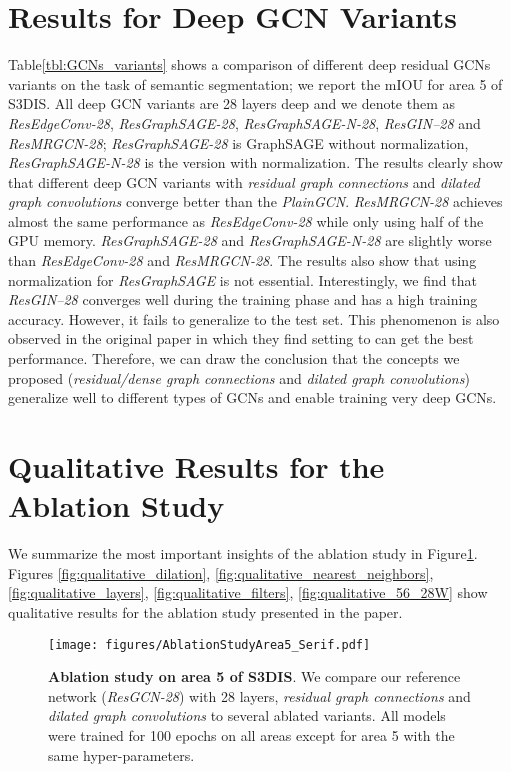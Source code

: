 \documentclass[10pt,twocolumn,letterpaper]{article}
\newcommand{\figLabel}{Figure\xspace}
\newcommand{\tblLabel}{Table\xspace}
\begin{document}
\section{Results for Deep GCN Variants}\label{appendix:results_gcn_variants}
\tblLabel \ref{tbl:GCNs_variants} shows a comparison of different deep residual GCNs variants on the task of semantic segmentation; we report the mIOU for area 5 of S3DIS. All deep GCN variants are 28 layers deep and we denote them as \emph{ResEdgeConv-28}, \emph{ResGraphSAGE-28}, \emph{ResGraphSAGE-N-28}, \emph{ResGIN--28} and \emph{ResMRGCN-28}; \emph{ResGraphSAGE-28} is GraphSAGE without normalization, \emph{ResGraphSAGE-N-28} is the version with normalization. The results clearly show that different deep GCN variants with \emph{residual graph connections} and \emph{dilated graph convolutions} converge better than the \emph{PlainGCN}. \emph{ResMRGCN-28} achieves almost the same performance as \emph{ResEdgeConv-28} while only using half of the GPU memory. \emph{ResGraphSAGE-28} and \emph{ResGraphSAGE-N-28} are slightly worse than \emph{ResEdgeConv-28} and \emph{ResMRGCN-28}. The results also show that using normalization for \emph{ResGraphSAGE} is not essential. Interestingly, we find that \emph{ResGIN--28} converges well during the training phase and has a high training accuracy. However, it fails to generalize to the test set. This phenomenon is also observed in the original paper \cite{xu2018powerful} in which they find setting  to  can get the best performance. Therefore, we can draw the conclusion that the concepts we proposed (\eg \emph{residual/dense graph connections} and \emph{dilated graph convolutions}) generalize well to different types of GCNs and enable training very deep GCNs.

\section{Qualitative Results for the Ablation Study} \label{appendix:qualitative_results}
We summarize the most important insights of the ablation study in \figLabel \ref{fig:ablation}. Figures \ref{fig:qualitative_dilation}, \ref{fig:qualitative_nearest_neighbors}, \ref{fig:qualitative_layers}, \ref{fig:qualitative_filters}, \ref{fig:qualitative_56_28W} show qualitative results for the ablation study presented in the paper.

\begin{figure} [!htb]
    \centering
    \texttt{[image: figures/AblationStudyArea5\_Serif.pdf]}
    \caption{\textbf{Ablation study on area 5 of S3DIS}. We compare our reference network (\emph{ResGCN-28}) with 28 layers, \emph{residual graph connections} and \emph{dilated graph convolutions} to several ablated variants. All models were trained for 100 epochs on all areas except for area 5 with the same hyper-parameters.}
    \label{fig:ablation}
\end{figure}
\end{document}
